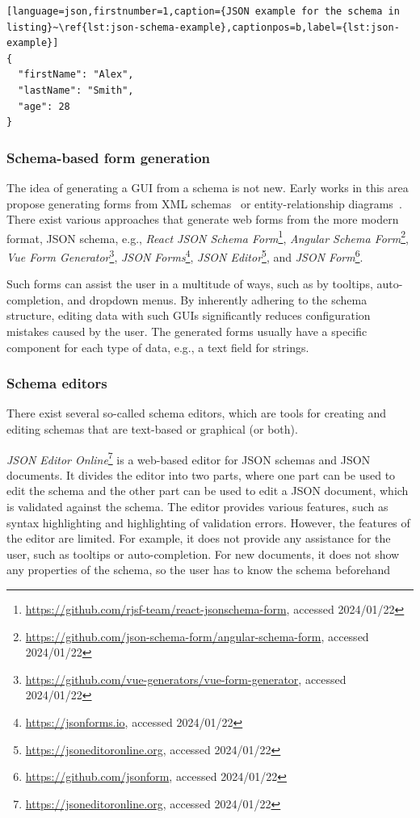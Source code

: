 \begin{lstlisting}[language=json,firstnumber=1,caption={JSON example for the schema in listing}~\ref{lst:json-schema-example},captionpos=b,label={lst:json-example}]
{
  "firstName": "Alex",
  "lastName": "Smith",
  "age": 28
}
\end{lstlisting}



\subsubsection{Schema-based form generation} %

The idea of generating a GUI from a schema is not new.
Early works in this area propose generating forms from XML schemas~\cite{kasarda2010generating, fenech2008semantic,
    kuo2005generating} or entity-relationship diagrams~\cite{bajaj2009user}.
There exist various approaches that generate web forms from the more modern format, JSON schema, e.g.,
\textit{React JSON Schema Form}\footnote{\url{https://github.com/rjsf-team/react-jsonschema-form}, accessed 2024/01/22},
\textit{Angular Schema Form}\footnote{\url{https://github.com/json-schema-form/angular-schema-form}, accessed 2024/01/22},
\textit{Vue Form Generator}\footnote{\url{https://github.com/vue-generators/vue-form-generator}, accessed 2024/01/22},
\textit{JSON Forms}\footnote{\url{https://jsonforms.io}, accessed 2024/01/22},
\textit{JSON Editor}\footnote{\url{https://jsoneditoronline.org}, accessed 2024/01/22}, and
\textit{JSON Form}\footnote{\url{https://github.com/jsonform}, accessed 2024/01/22}.

Such forms can assist the user in a multitude of ways, such as by tooltips, auto-completion, and dropdown menus.
By inherently adhering to the schema structure, editing data with such GUIs significantly reduces configuration mistakes caused by the user.
The generated forms usually have a specific component for each type of data, e.g., a text field for strings.




\subsubsection{Schema editors}
There exist several so-called schema editors, which are tools for creating and editing schemas that are text-based or graphical (or both).

\textit{JSON Editor Online}\footnote{\url{https://jsoneditoronline.org}, accessed 2024/01/22} is a web-based editor for JSON schemas and JSON documents.
It divides the editor into two parts, where one part can be used to edit the schema and the other part can be used to edit a JSON document,
which is validated against the schema.
The editor provides various features, such as syntax highlighting and highlighting of validation errors. 
However, the features of the editor are limited.
For example, it does not provide any assistance for the user, such as tooltips or auto-completion.
For new documents, it does not show any properties of the schema, so the user has to know the schema beforehand

